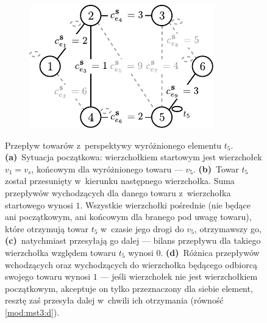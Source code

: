 \begin{figure}[!htbp]
\begin{subfigure}[b]{0.242\textwidth}
		\caption{}
		\label{fig:mst4Example:c}
	\end{subfigure}
	\hfill
	\begin{subfigure}[b]{0.242\textwidth}
		\includegraphics[width=\textwidth]{Chapter_III/MST4-example/d}
		\caption{}
		\label{fig:mst4Example:d}
	\end{subfigure}
	\hfill\null
	\caption{
		Przepływ towarów z~perspektywy wyróżnionego elementu $t_{5}$.
		\textbf{(a)}~Sytuacja początkowa: wierzchołkiem startowym jest wierzchołek $v_{1} = v_{s}$, końcowym dla wyróżnionego towaru --- $v_{5}$.
		\textbf{(b)}~Towar $t_{5}$ został przesunięty w~kierunku następnego wierzchołka.
		Suma przepływów wychodzących dla danego towaru z~wierzchołka startowego wynosi $1$.
		Wszystkie wierzchołki pośrednie (nie będące ani początkowym, ani końcowym dla branego pod uwagę towaru), które otrzymują towar $t_{5}$ w~czasie jego drogi do $v_{5}$, otrzymawszy go,
		\textbf{(c)}~natychmiast przesyłają go dalej --- bilans przepływu dla takiego wierzchołka względem towaru $t_{5}$ wynosi $0$.
		\textbf{(d)}~Różnica przepływów wchodzących oraz wychodzących do wierzchołka będącego odbiorcą swojego towaru wynosi $1$ --- jeśli wierzchołek nie jest wierzchołkiem początkowym, akceptuje on tylko przeznaczony dla siebie element, resztę zaś przesyła dalej w~chwili ich otrzymania (równość \ref{mod:mst3:d}).
	}
	\label{fig:mst4Example}
\end{figure}

